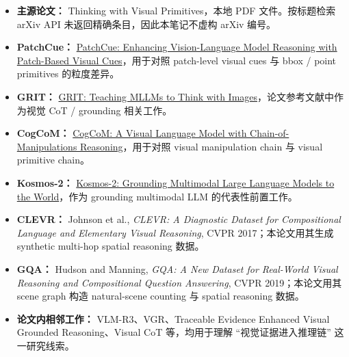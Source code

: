\begin{itemize}[leftmargin=1.5em]
  \item \textbf{主源论文：} Thinking with Visual Primitives，本地 PDF 文件。按标题检索 arXiv API 未返回精确条目，因此本笔记不虚构 arXiv 编号。
  \item \textbf{PatchCue：} \href{https://arxiv.org/abs/2603.05869}{PatchCue: Enhancing Vision-Language Model Reasoning with Patch-Based Visual Cues}，用于对照 patch-level visual cues 与 bbox / point primitives 的粒度差异。
  \item \textbf{GRIT：} \href{https://arxiv.org/abs/2505.15879}{GRIT: Teaching MLLMs to Think with Images}，论文参考文献中作为视觉 CoT / grounding 相关工作。
  \item \textbf{CogCoM：} \href{https://arxiv.org/abs/2402.04236}{CogCoM: A Visual Language Model with Chain-of-Manipulations Reasoning}，用于对照 visual manipulation chain 与 visual primitive chain。
  \item \textbf{Kosmos-2：} \href{https://arxiv.org/abs/2306.14824}{Kosmos-2: Grounding Multimodal Large Language Models to the World}，作为 grounding multimodal LLM 的代表性前置工作。
  \item \textbf{CLEVR：} Johnson et al., \textit{CLEVR: A Diagnostic Dataset for Compositional Language and Elementary Visual Reasoning}, CVPR 2017；本论文用其生成 synthetic multi-hop spatial reasoning 数据。
  \item \textbf{GQA：} Hudson and Manning, \textit{GQA: A New Dataset for Real-World Visual Reasoning and Compositional Question Answering}, CVPR 2019；本论文用其 scene graph 构造 natural-scene counting 与 spatial reasoning 数据。
  \item \textbf{论文内相邻工作：} VLM-R3、VGR、Traceable Evidence Enhanced Visual Grounded Reasoning、Visual CoT 等，均用于理解 ``视觉证据进入推理链'' 这一研究线索。
\end{itemize}
